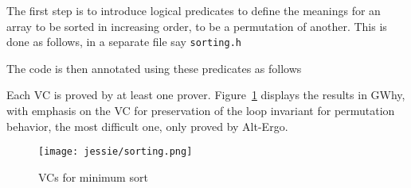 \documentclass[a4paper,11pt,twoside,openright]{report}
\newcommand{\negtenthspace}{\hspace*{-0.1\linewidth}}
\begin{document}
The first step is to introduce logical predicates to define the
meanings for an array to be sorted in increasing order, to be a
permutation of another. This is done as follows, in a separate file
say \texttt{sorting.h}



The code is then annotated using these predicates as follows



Each VC is proved by at least one prover. Figure~\ref{fig:sorting}
displays the results in GWhy, with emphasis on the VC for preservation
of the loop invariant for permutation behavior, the most
difficult one, only proved by Alt-Ergo.

\begin{figure}[t]
  \begin{center}
    \negtenthspace\texttt{[image: jessie/sorting.png]}
  \end{center}
  \caption{VCs for minimum sort}
  \label{fig:sorting}
  \hrulefill
\end{figure}






% 
\end{document}

